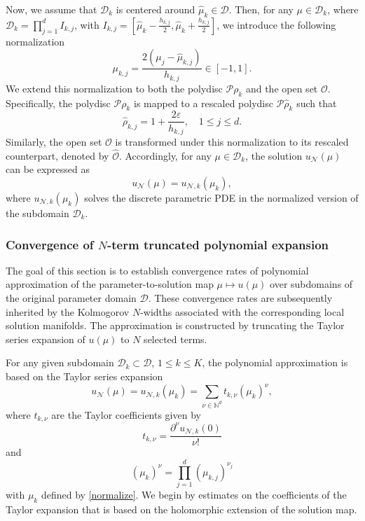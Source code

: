 \documentclass[12pt]{article}
\theoremstyle{remark}
\theoremstyle{definition}
\numberwithin{equation}{section}
\begin{document}
Now, we assume that ${\mathcal{D}}_k$ is centered around $\hat{\mu}_k \in \mathcal{D}$. Then, for any $\mu \in \mathcal{D}_k$, where $\mathcal{D}_k=\prod_{j=1}^dI_{k,j}$, with $I_{k,j}=[\hat{\mu}_k-\frac{h_{k,j}}{2},\hat{\mu}_k+\frac{h_{k,j}}{2}]$, we introduce the following normalization
\begin{equation}
    \mu_{k,j}=\frac{2(\mu_j-\hat{\mu}_{k,j})}{h_{k,j}} \in [-1,1].
    \label{normalize}
\end{equation}
We extend this normalization to both the polydisc $\mathcal{P}{\rho_k}$ and the open set  $\mathcal{O}$. Specifically, the polydisc $\mathcal{P}{\rho_k}$ is mapped to a rescaled polydisc $\mathcal{P}{\hat{\rho}_k}$ such that 
\begin{equation}
    \hat\rho_{k,j}=1+\frac{2\varepsilon}{h_{k,j}},  \quad 1\leq j\leq d.
\end{equation}
Similarly, the open set $\mathcal{O}$ is transformed under this normalization to its rescaled counterpart, denoted by $\hat{\mathcal{O}}$. Accordingly, for any $\mu \in \mathcal{D}_k$, the solution $u_{\mathcal{N}}(\mu)$ can be expressed as
\begin{equation}
    u_{\mathcal{N}}(\mu)=u_{\mathcal{N},k} (\mu_k),
\end{equation}
where $u_{\mathcal{N},k}(\mu_k)$ solves the discrete parametric PDE in the normalized version of the subdomain $\mathcal{D}_k$.


\subsubsection{Convergence of $N$-term truncated polynomial expansion}
The goal of this section is to establish convergence rates of polynomial approximation of the parameter-to-solution map $\mu \mapsto u(\mu)$ over subdomains of the original parameter domain $\mathcal{D}$. These convergence rates are subsequently inherited by the Kolmogorov $N$-widths associated with the corresponding local solution manifolds. The approximation is constructed by truncating the Taylor series expansion of $u(\mu)$ to $N$ selected terms.

For any given subdomain $\mathcal{D}_k \subset \mathcal{D}$, $1 \leq k \leq K$, the polynomial approximation is based on the Taylor series expansion 
\begin{equation}
    u_{\mathcal{N}}(\mu)=u_{\mathcal{N},k}(\mu_k)=\sum_{\nu \in \mathbb{N}^d} t_{k,\nu} (\mu_k)^{\nu}, 
\end{equation}
where $t_{k,\nu}$ are the Taylor coefficients given by
\begin{equation}
    t_{k,\nu}=\frac{\partial^{\nu}u_{\mathcal{N},k}(0)}{\nu!}
\end{equation}
and
\begin{equation}
    (\mu_k)^{\nu}=\prod_{j=1}^d (\mu_{k,j})^{\nu_j}
\end{equation}
with $\mu_k$ defined by \eqref{normalize}. We begin by estimates on the coefficients of the Taylor expansion that is based on the holomorphic extension of the solution map.
\end{document}
